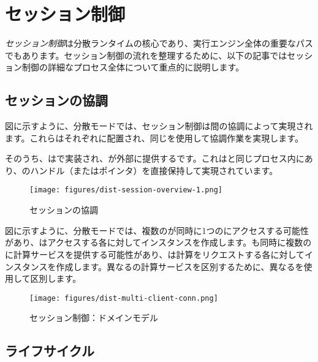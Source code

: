\section{セッション制御}

\begin{content}

\emph{セッション制御}は\tf{}分散ランタイムの核心であり、\tf{}実行エンジン全体の重要なパスでもあります。セッション制御の流れを整理するために、以下の記事ではセッション制御の詳細なプロセス全体について重点的に説明します。

\subsection{セッションの協調}

図に示すように、分散モードでは、セッション制御は間の協調によって実現されます。これらはそれぞれに配置され、同じを使用して協調作業を実現します。

そのうち、はで実装され、\tf{}が外部に提供するです。これはと同じプロセス内にあり、のハンドル（またはポインタ）を直接保持して実現されています。

\begin{figure}[H]
\centering
\texttt{[image: figures/dist-session-overview-1.png]}
\caption{セッションの協調}
 \label{fig:dist-session-overview}
\end{figure}

図に示すように、分散モードでは、複数のが同時に1つのにアクセスする可能性があり、はアクセスする各に対してインスタンスを作成します。も同時に複数のに計算サービスを提供する可能性があり、は計算をリクエストする各に対してインスタンスを作成します。異なるの計算サービスを区別するために、異なるを使用して区別します。

\begin{figure}[H]
\centering
\texttt{[image: figures/dist-multi-client-conn.png]}
\caption{セッション制御：ドメインモデル}
 \label{fig:dist-multi-client-conn}
\end{figure}

\subsection{ライフサイクル}


\end{content}
